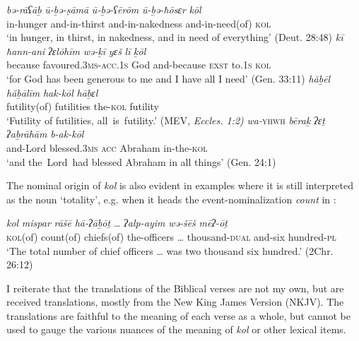 \documentclass[output=paper]{langsci/langscibook}
\begin{document}
\ea%
    \label{ex:doron:11}
    \ea
    \gll \textit{bə-rāʕāḇ}    \textit{ū-ḇə{}-ṣāmā}      \textit{ū-ḇə{}-ʕērōm}            \textit{ū-ḇə{}-ħōsɛr}         \textit{kōl} \\
         in-hunger   and-in-thirst   and-in-nakedness  and-in-need(of)  \textsc{kol}                     \\
    \glt `in hunger, in thirst, in nakedness, and in need of everything' (Deut. 28:48)
    \ex
    \gll \textit{kī}           \textit{ħann-ani}                      \textit{ʔɛlōhīm}  \textit{wə-ḵī}              \textit{yɛš}    \textit{lī}       \textit{ḵōl}\\
         because favoured.\textsc{3ms-acc.1s}  God        and-because  \textsc{exst} to\textsc{.1s}  \textsc{kol}\\
    \glt `for God has been generous to me and I have all I need' (Gen. 33:11)
    \z
\ex %
 \label{ex:doron:12}
 \ea
 \gll \textit{hăḇēl}          \textit{hăḇālīm}   \textit{hak-kōl}    \textit{hāḇɛl}\\
      futility(of)  futilities   the-\textsc{kol}  futility \\
 \glt `Futility of futilities, all{~}is{~}futility.' (MEV, \emph{\textup{Eccles.} \emph{1:2)}}
 \ex
 \gll \textit{wa-}\textsc{yhwh}   \textit{bēraḵ}             \textit{ʔɛṯ}    \textit{ʔaḇrāhām}    \textit{b-ak-kōl}\\
      and-Lord   blessed.\textsc{3ms}   \textsc{acc}  Abraham     in-the-\textsc{kol}\\
 \glt `and the~Lord~had blessed Abraham in all things' (Gen. 24:1)
 \z
\z

The nominal origin of  \textit{kol} is also evident in examples where it is still interpreted as the noun ‘totality’, e.g. when it heads the event-nominalization \textit{count} in :

\ea%
    \label{ex:doron:13}
    \gll \textit{kol}         \textit{mispar}       \textit{rāšē}         \textit{hā-ʔāḇōṯ} \textit{…}      \textit{ʔalp-ayim}          \textit{wə-šēš}  \textit{mēʔ-ōṯ}\\
         \textsc{kol}(of) count(of)  chiefs(of) the-officers … thousand-\textsc{dual} and-six  hundred-\textsc{pl}\\
    \glt `The total number of chief officers\textsuperscript{} … was two thousand six hundred.' (2Chr. 26:12)
    \z

I reiterate that the translations of the Biblical verses are not my own, but are received translations, mostly from the New King James Version (NKJV). The translations are faithful to the meaning of each verse as a whole, but cannot be used to gauge the various nuances of the meaning of \textit{kol} or other lexical items.
\end{document}
